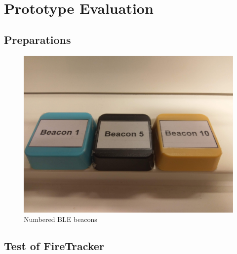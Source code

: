\documentclass[../Main/thesis.tex]{subfiles}
\begin{document}
\chapter{Prototype Evaluation}
\label{ch:evaluation}

\section{Preparations}
\begin{figure}[h]
	\centering
	\includegraphics[width=\textwidth]{../fig/beacons}
	\caption{Numbered BLE beacons}
	\label{fig:beacons}
\end{figure}
\section{Test of FireTracker}
\end{document}

